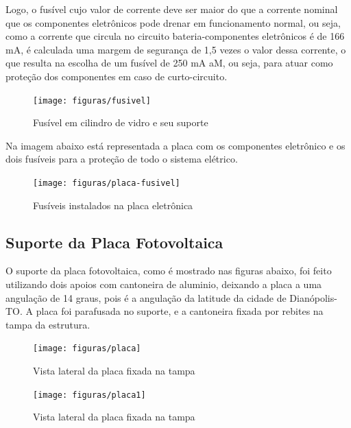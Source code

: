 \par Logo, o fusível cujo valor de corrente deve ser maior do que a corrente nominal que os componentes eletrônicos pode drenar em funcionamento normal, ou seja, como a corrente que circula no circuito bateria-componentes eletrônicos é de 166 mA,  é calculada uma margem de segurança de 1,5 vezes o valor dessa corrente, o que resulta na escolha de um fusível de 250 mA aM, ou seja, para atuar como proteção dos componentes em caso de curto-circuito.


\begin{figure}[!h]
\centering
\texttt{[image: figuras/fusivel]}
\caption{Fusível em cilindro de vidro e seu suporte}
\label{fusivel}
\end{figure}
\par Na imagem abaixo está representada a placa com os componentes eletrônico e os dois fusíveis para a proteção de todo o sistema elétrico.

\begin{figure}[!h]
\centering
\texttt{[image: figuras/placa-fusivel]}
\caption{Fusíveis instalados na placa eletrônica}
\label{fusivel}
\end{figure}
\pagebreak

\subsection{Suporte da Placa Fotovoltaica}

O suporte da placa fotovoltaica, como é mostrado nas figuras abaixo, foi feito utilizando dois apoios com cantoneira de aluminio, deixando a placa a uma angulação de 14 graus, pois é a angulação da latitude da cidade de Dianópolis-TO. A placa foi parafusada no suporte, e a cantoneira fixada por rebites na tampa da estrutura.

\begin{figure}[!h]
\centering
\texttt{[image: figuras/placa]}
\caption{Vista lateral da placa fixada na tampa}
\label{placa}
\end{figure}

\begin{figure}[!h]
\centering
\texttt{[image: figuras/placa1]}
\caption{Vista lateral da placa fixada na tampa}
\label{placa1}
\end{figure}
